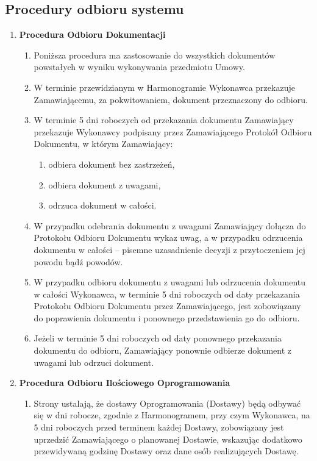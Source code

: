 \documentclass{article}
\begin{document}
\subsection{Procedury odbioru systemu}
\begin{enumerate}
\item \textbf{Procedura Odbioru Dokumentacji}
\begin{enumerate}
\item Poniższa procedura ma zastosowanie do wszystkich dokumentów powstałych w wyniku wykonywania przedmiotu Umowy.
\item W terminie przewidzianym w Harmonogramie Wykonawca przekazuje Zamawiającemu, za pokwitowaniem, dokument przeznaczony do odbioru.
\item W terminie 5 dni roboczych od przekazania dokumentu Zamawiający przekazuje Wykonawcy podpisany przez Zamawiającego Protokół Odbioru Dokumentu, w którym Zamawiający:
\begin{enumerate}
\item odbiera dokument bez zastrzeżeń,
\item odbiera dokument z uwagami,
\item odrzuca dokument w całości.
\end{enumerate}
\item W przypadku odebrania dokumentu z uwagami Zamawiający dołącza do Protokołu Odbioru Dokumentu wykaz uwag, a w przypadku odrzucenia dokumentu w całości – pisemne uzasadnienie decyzji z przytoczeniem jej powodu bądź powodów.
\item W przypadku odbioru dokumentu z uwagami lub odrzucenia dokumentu w całości Wykonawca, w terminie 5 dni roboczych od daty przekazania Protokołu Odbioru Dokumentu przez Zamawiającego, jest zobowiązany do poprawienia dokumentu i ponownego przedstawienia go do odbioru.
\item Jeżeli w terminie 5 dni roboczych od daty ponownego przekazania dokumentu do odbioru,  Zamawiający ponownie odbierze dokument z uwagami lub odrzuci dokument.
\end{enumerate}
\item \textbf{Procedura Odbioru Ilościowego Oprogramowania}
\begin{enumerate}
\item Strony ustalają, że dostawy Oprogramowania (Dostawy) będą odbywać się w dni robocze, zgodnie z Harmonogramem, przy czym Wykonawca, na 5 dni roboczych przed terminem każdej Dostawy, zobowiązany jest uprzedzić Zamawiającego o planowanej Dostawie, wskazując dodatkowo przewidywaną godzinę Dostawy oraz dane osób realizujących Dostawę.

\end{enumerate}
\end{enumerate}
\end{document}

